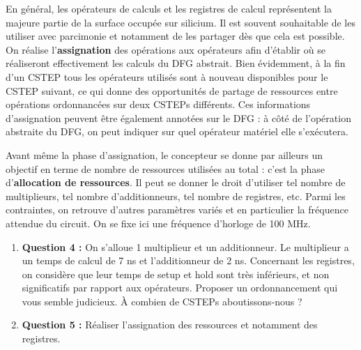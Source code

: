 \documentclass[a4paper,11pt]{article}
\begin{document}
En général, les opérateurs de calculs et les registres de calcul représentent la majeure partie de la surface occupée sur silicium. Il est souvent souhaitable de les utiliser avec parcimonie et notamment de les partager dès que cela est possible. On réalise l'\textbf{assignation} des opérations aux opérateurs afin d'établir où se réaliseront effectivement les calculs du DFG abstrait. Bien évidemment, à la fin d'un CSTEP tous les opérateurs utilisés sont à nouveau disponibles pour le CSTEP suivant, ce qui donne des opportunités de partage de ressources entre opérations ordonnancées sur deux CSTEPs différents. Ces informations d'assignation peuvent être également annotées sur le DFG : à côté de l'opération abstraite du DFG, on peut indiquer sur quel opérateur matériel elle s'exécutera.

Avant même la phase d'assignation, le concepteur se donne par ailleurs un objectif en terme de nombre de ressources utilisées au total : c'est la phase d'\textbf{allocation de ressources}. Il peut se donner le droit d'utiliser tel nombre de multiplieurs, tel nombre d'additionneurs, tel nombre de registres, etc. Parmi les contraintes, on retrouve d'autres paramètres variés et en particulier la fréquence attendue du circuit. On se fixe ici une fréquence d'horloge de 100 MHz.

\begin{questionbox}
\begin{enumerate}
    \item \textbf{Question 4 :} On s'alloue 1 multiplieur et un additionneur. Le multiplieur a un temps de calcul de 7 ns et l'additionneur de 2 ns. Concernant les registres, on considère que leur temps de setup et hold sont très inférieurs, et non significatifs par rapport aux opérateurs. Proposer un ordonnancement qui vous semble judicieux. À combien de CSTEPs aboutissons-nous ?
    \item \textbf{Question 5 :} Réaliser l'assignation des ressources et notamment des registres.
\end{enumerate}
\end{questionbox}
\end{document}
